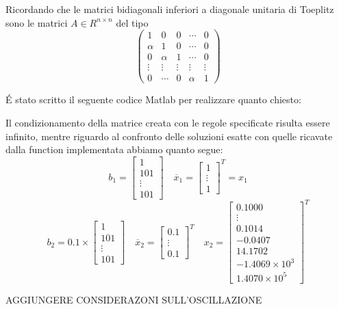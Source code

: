 \begin{center}
\footnotesize\noindent{}\end{center}

\noindent Ricordando che le matrici bidiagonali inferiori a diagonale unitaria di Toeplitz sono le matrici \(A \in R^{n \times n}\) del tipo \[\begin{pmatrix} 1 & 0 & 0 & \cdots & 0 \\ \alpha & 1 & 0 & \cdots & 0 \\ 0 & \alpha & 1 & \cdots & 0 \\ \vdots & \vdots & \vdots & \vdots & \vdots \\ 0 & \cdots & 0 & \alpha & 1\end{pmatrix}\]

\noindent \'E stato scritto il seguente codice Matlab per realizzare quanto chiesto:


\noindent Il condizionamento della matrice creata con le regole specificate risulta essere infinito, mentre riguardo al confronto delle soluzioni esatte con quelle ricavate dalla function implementata abbiamo quanto segue:
\[
b_1 = \begin{bmatrix}1\\101\\\vdots \\101 \end{bmatrix} \quad \overline{x}_1=\begin{bmatrix}1\\\vdots \\1 \end{bmatrix}^T = x_1
\]
\[
b_2 = 0.1 \times \begin{bmatrix}1\\101\\\vdots \\101 \end{bmatrix} \quad \overline{x}_2=\begin{bmatrix}0.1\\\vdots \\0.1 \end{bmatrix}^T \quad x_2=\begin{bmatrix}0.1000\\ \vdots \\ 0.1014 \\ -0.0407 \\ 14.1702 \\ -1.4069 \times 10^3 \\ 1.4070 \times 10^5 \end{bmatrix}^T
\]

AGGIUNGERE CONSIDERAZONI SULL'OSCILLAZIONE
